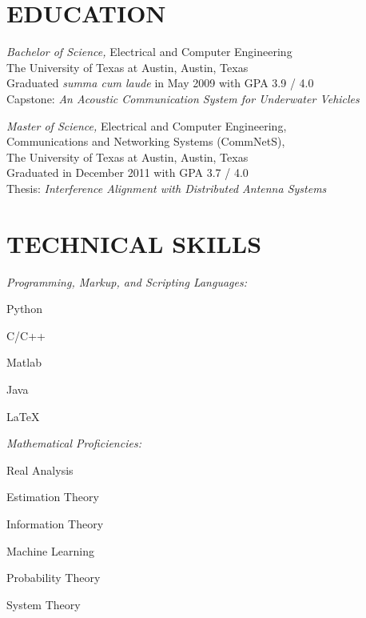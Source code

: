 \documentclass[line,margin=1in]{res}
\begin{document}
\address{1205 Larkwood Drive, Austin, Texas 78723}
\address{512-237-7562 \\ \url{jonstarr@utexas.edu}}
 
\begin{resume}

\section{EDUCATION} 
{\sl Bachelor of Science,} Electrical and Computer Engineering \\
  The University of Texas at Austin, Austin, Texas \\
  Graduated \textit{summa cum laude} in May 2009 with GPA 3.9 / 4.0 \\
  Capstone: \textit{An Acoustic Communication System for Underwater Vehicles}~\cite{starr2009acoustic}

{\sl Master of Science,} Electrical and Computer Engineering, \\
  Communications and Networking Systems (CommNetS), \\
  The University of Texas at Austin, Austin, Texas \\
  Graduated in December 2011 with GPA 3.7 / 4.0 \\
  Thesis: \textit{Interference Alignment with Distributed Antenna Systems}~\cite{starr2011thesis}

\section{TECHNICAL SKILLS} 
  {\sl Programming, Markup, and Scripting Languages:}
  \vspace*{-0.75\baselineskip}
  \begin{multicols}{6}
    \begin{compactitem}
      \item{Python}
      \item{C/C++}
      \item{Matlab}
      \item{Java}
      \item{\LaTeX}
    \end{compactitem}
  \end{multicols}

  \vspace*{-1.5\baselineskip}

  {\sl Mathematical Proficiencies:}
  \vspace*{-0.75\baselineskip}
  \begin{multicols}{3}
    \begin{compactitem}
      \item{Real Analysis}
      \item{Estimation Theory}
      \item{Information Theory}
      \item{Machine Learning}
      \item{Probability Theory}
      \item{System Theory}
    \end{compactitem}
  \end{multicols}


\end{resume}
\end{document}
